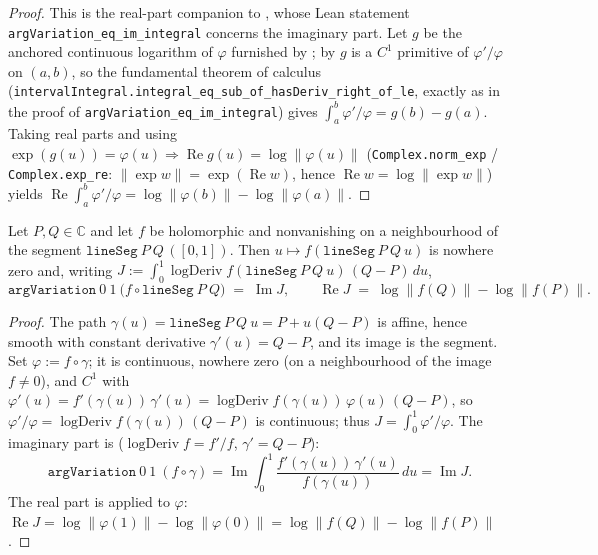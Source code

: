 \begin{proof}
\leanok
{}
This is the real-part companion to , whose Lean statement
\texttt{argVariation\_eq\_im\_integral} concerns the imaginary part. Let $g$ be the anchored continuous logarithm of $\varphi$
furnished by ; by  $g$ is a $C^1$
primitive of $\varphi'/\varphi$ on $(a,b)$, so the fundamental theorem of calculus
(\texttt{intervalIntegral.integral\_eq\_sub\_of\_hasDeriv\_right\_of\_le}, exactly as
in the proof of \texttt{argVariation\_eq\_im\_integral}) gives
$\int_a^b \varphi'/\varphi = g(b)-g(a)$. Taking real parts and using
$\exp(g(u))=\varphi(u)\Rightarrow\operatorname{Re} g(u)=\log\lVert\varphi(u)\rVert$
(\texttt{Complex.norm\_exp} / \texttt{Complex.exp\_re}: $\lVert\exp w\rVert
=\exp(\operatorname{Re} w)$, hence $\operatorname{Re} w=\log\lVert\exp w\rVert$) yields
$\operatorname{Re}\int_a^b\varphi'/\varphi=\log\lVert\varphi(b)\rVert
-\log\lVert\varphi(a)\rVert$.
\end{proof}

\begin{lemma}
\label{lem:ap_side_integral}
\leanok
{}
Let $P,Q\in\mathbb C$ and let $f$ be holomorphic and nonvanishing on a neighbourhood
of the segment $\texttt{lineSeg}\ P\ Q\,([0,1])$. Then $u\mapsto f(\texttt{lineSeg}\
P\ Q\ u)$ is nowhere zero and, writing
$J:=\int_0^1 \operatorname{logDeriv} f(\texttt{lineSeg}\ P\ Q\ u)\,(Q-P)\,du$,
\[
  \texttt{argVariation}\ 0\ 1\ \bigl(f\circ\texttt{lineSeg}\ P\ Q\bigr)
  \;=\; \operatorname{Im} J ,
  \qquad
  \operatorname{Re} J \;=\; \log\lVert f(Q)\rVert-\log\lVert f(P)\rVert .
\]
\end{lemma}

\begin{proof}
\leanok
{}
The path $\gamma(u)=\texttt{lineSeg}\ P\ Q\ u=P+u(Q-P)$ is affine, hence smooth with
constant derivative $\gamma'(u)=Q-P$, and its image is the segment. Set
$\varphi:=f\circ\gamma$; it is continuous, nowhere zero (on a neighbourhood of the
image $f\neq0$), and $C^1$ with $\varphi'(u)=f'(\gamma(u))\,\gamma'(u)
=\operatorname{logDeriv} f(\gamma(u))\,\varphi(u)\,(Q-P)$, so $\varphi'/\varphi
=\operatorname{logDeriv} f(\gamma(u))\,(Q-P)$ is continuous; thus $J=\int_0^1
\varphi'/\varphi$. The imaginary part is \Cref{lem:av_integral}
($\operatorname{logDeriv} f=f'/f$, $\gamma'=Q-P$):
\[
  \texttt{argVariation}\ 0\ 1\ (f\circ\gamma)
  = \operatorname{Im}\!\int_0^1 \frac{f'(\gamma(u))\,\gamma'(u)}{f(\gamma(u))}\,du
  = \operatorname{Im} J .
\]
The real part is  applied to $\varphi$:
$\operatorname{Re} J = \log\lVert\varphi(1)\rVert-\log\lVert\varphi(0)\rVert
= \log\lVert f(Q)\rVert-\log\lVert f(P)\rVert$.
\end{proof}

